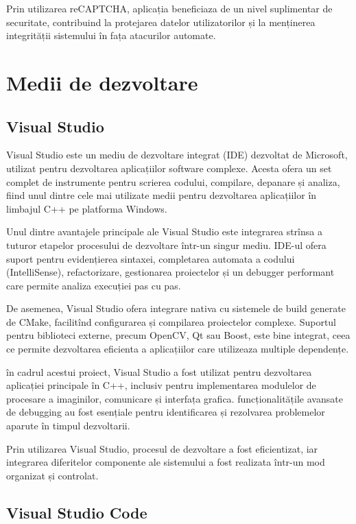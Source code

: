 Prin utilizarea reCAPTCHA, aplicația beneficiaza de un nivel suplimentar de securitate, contribuind la protejarea datelor utilizatorilor și la menținerea integrității sistemului în fața atacurilor automate.

\section{Medii de dezvoltare}

\subsection*{Visual Studio}

Visual Studio este un mediu de dezvoltare integrat (IDE) dezvoltat de Microsoft, utilizat pentru dezvoltarea aplicațiilor software complexe. Acesta ofera un set complet de instrumente pentru scrierea codului, compilare, depanare și analiza, fiind unul dintre cele mai utilizate medii pentru dezvoltarea aplicațiilor în limbajul C++ pe platforma Windows.

Unul dintre avantajele principale ale Visual Studio este integrarea strînsa a tuturor etapelor procesului de dezvoltare într-un singur mediu. IDE-ul ofera suport pentru evidențierea sintaxei, completarea automata a codului (IntelliSense), refactorizare, gestionarea proiectelor și un debugger performant care permite analiza execuției pas cu pas.

De asemenea, Visual Studio ofera integrare nativa cu sistemele de build generate de CMake, facilitînd configurarea și compilarea proiectelor complexe. Suportul pentru biblioteci externe, precum OpenCV, Qt sau Boost, este bine integrat, ceea ce permite dezvoltarea eficienta a aplicațiilor care utilizeaza multiple dependențe.

în cadrul acestui proiect, Visual Studio a fost utilizat pentru dezvoltarea aplicației principale în C++, inclusiv pentru implementarea modulelor de procesare a imaginilor, comunicare și interfața grafica. funcționalitățile avansate de debugging au fost esențiale pentru identificarea și rezolvarea problemelor aparute în timpul dezvoltarii.

Prin utilizarea Visual Studio, procesul de dezvoltare a fost eficientizat, iar integrarea diferitelor componente ale sistemului a fost realizata într-un mod organizat și controlat.

\subsection*{Visual Studio Code}

